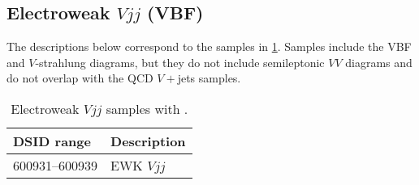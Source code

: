 



\subsection{Electroweak \(Vjj\) (VBF)}

The descriptions below correspond to the samples in
\cref{tab:ewkvjets-pp8}.  Samples include the VBF and \(V\)-strahlung diagrams, but
they do not include semileptonic \(VV\) diagrams and do not overlap with the QCD \(V+\)jets samples.

\begin{table}[!htbp]
  \caption{Electroweak \(Vjj\) samples with \POWHEG.}%
  \label{tab:ewkvjets-pp8}
  \centering
  \begin{tabular}{l l}
    \toprule
    DSID range & Description \\
    \midrule
    600931--600939 & EWK \(Vjj\) \\
    \bottomrule
  \end{tabular}
\end{table}

